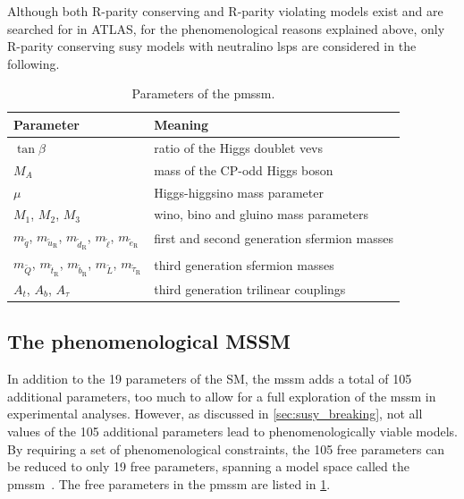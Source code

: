 Although both R-parity conserving and R-parity violating models exist and are searched for in ATLAS, for the phenomenological reasons explained above, only R-parity conserving \gls{susy} models with neutralino \glspl{lsp} are considered in the following.

\begin{table}
	\centering
	\setlength\heavyrulewidth{0.2ex}
	\small
	\caption{Parameters of the \gls{pmssm}.}
	\begin{tabular} {l l}
	\toprule
		Parameter & Meaning \\ 
	\midrule
	$\tan{\beta}$ & ratio of the Higgs doublet \glspl{vev} \\
	$M_A$ & mass of the CP-odd Higgs boson \\
	$\mu$ & Higgs-higgsino mass parameter \\
	$M_1$, $M_2$, $M_3$ & wino, bino and gluino mass parameters \\
	$m_{\tilde{q}}$, $m_{\tilde{u}_\mathrm{R}}$, $m_{\tilde{d}_\mathrm{R}}$, $m_{\tilde{\ell}}$, $m_{\tilde{e}_\mathrm{R}}$ & first and second generation sfermion masses \\
	$m_{\tilde{Q}}$, $m_{\tilde{t}_\mathrm{R}}$, $m_{\tilde{b}_\mathrm{R}}$, $m_{\tilde{L}}$, $m_{\tilde{\tau}_\mathrm{R}}$ & third generation sfermion masses \\
	$A_t$, $A_b$, $A_\tau$ & third generation trilinear couplings \\
	\bottomrule					
	\end{tabular}\vspace{3mm}
	\label{tab:parameters_pmssm}   
\end{table}

\subsection{The phenomenological MSSM}\label{sec:theory_pmssm}

In addition to the 19 parameters of the SM, the \gls{mssm} adds a total of 105 additional parameters, too much to allow for a full exploration of the \gls{mssm} in experimental analyses. However, as discussed in \cref{sec:susy_breaking}, not all values of the 105 additional parameters lead to phenomenologically viable models. By requiring a set of phenomenological constraints, the 105 free parameters can be reduced to only 19 free parameters, spanning a model space called the \gls{pmssm}~\cite{Djouadi:2002ze,Berger_2009}. The free parameters in the \gls{pmssm} are listed in \cref{tab:parameters_pmssm}.


